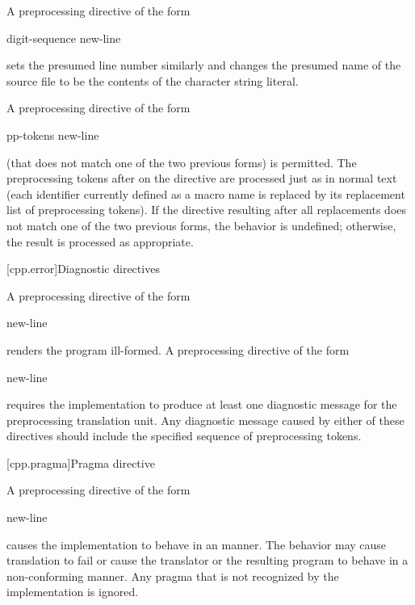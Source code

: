 \pnum
A preprocessing directive of the form
\begin{ncsimplebnf}
 digit-sequence    new-line
\end{ncsimplebnf}
sets the presumed line number similarly and changes the
presumed name of the source file to be the contents
of the character string literal.

\pnum
A preprocessing directive of the form
\begin{ncsimplebnf}
 pp-tokens new-line
\end{ncsimplebnf}
(that does not match one of the two previous forms)
is permitted.
The preprocessing tokens after
on the directive are processed just as in normal text
(each identifier currently defined as a macro name is replaced by its
replacement list of preprocessing tokens).
If the directive resulting after all replacements does not match
one of the two previous forms, the behavior is undefined;
otherwise, the result is processed as appropriate.

[cpp.error]{Diagnostic directives}%
%
%
%

\pnum
A preprocessing directive of the form
\begin{ncsimplebnf}
  new-line
\end{ncsimplebnf}
renders the program ill-formed.
A preprocessing directive of the form
\begin{ncsimplebnf}
  new-line
\end{ncsimplebnf}
requires the implementation to produce at least one diagnostic message
for the preprocessing translation unit.
\recommended
Any diagnostic message caused by either of these directives
should include the specified sequence of preprocessing tokens.

[cpp.pragma]{Pragma directive}%
%

\pnum
A preprocessing directive of the form
\begin{ncsimplebnf}
  new-line
\end{ncsimplebnf}
causes the implementation to behave
in an  manner.
The behavior may cause translation to fail or cause the translator or
the resulting program to behave in a non-conforming manner.
Any pragma that is not recognized by the implementation is ignored.

